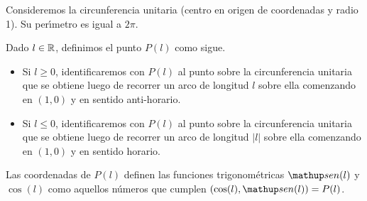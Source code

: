 Consideremos la circunferencia unitaria (centro en origen de coordenadas y radio 1).
Su per\'{\i}metro es igual a $2\pi$.

\begin{center}
\end{center}


\begin{defn}
Dado $l\in\mathbb{R}$, definimos el punto $P(l)$ como sigue.
\begin{itemize}
\item Si $l \ge 0$, identificaremos con $P(l)$ al punto sobre la circunferencia unitaria que se obtiene luego de recorrer un arco de longitud $l$ sobre ella comenzando en $(1,0)$ y en sentido anti-horario.

\item Si $l \le 0$, identificaremos con $P(l)$ al punto sobre la circunferencia unitaria que se obtiene luego de recorrer un arco de longitud $|l|$ sobre ella comenzando en $(1,0)$ y en sentido horario.
\end{itemize}
Las coordenadas de $P(l)$ definen las funciones trigonométricas $\sen(l)$ y $\cos(l)$ como aquellos números que cumplen $(\cos(l),\sen(l))=P(l)$.
\end{defn}

